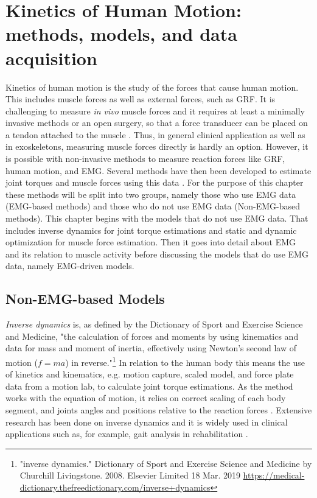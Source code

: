 \section{Kinetics of Human Motion: methods, models, and data acquisition}
\label{sec:A-MSModels}
Kinetics of human motion is the study of the forces that cause human motion. 
This includes muscle forces as well as external forces, such as \ac{GRF}.
It is challenging to measure \textit{in vivo} muscle forces and it requires at least a minimally invasive methods or an open surgery, so that a force transducer can be placed on a tendon attached to the muscle \cite{Erdemir2007}. 
Thus, in general clinical application as well as in exoskeletons, measuring muscle forces directly is hardly an option.
However, it is possible with non-invasive methods to measure reaction forces like \ac{GRF}, human motion, and \ac{EMG}.
Several methods have then been developed to estimate joint torques and muscle forces using this data \cite{Erdemir2007}.
For the purpose of this chapter these methods will be split into two groups, namely those who use \ac{EMG} data (\ac{EMG}-based methods) and those who do not use \ac{EMG} data (Non-\ac{EMG}-based methods).
This chapter begins with the models that do not use \ac{EMG} data.
That includes inverse dynamics for joint torque estimations and static and dynamic optimization for muscle force estimation. 
Then it goes into detail about \ac{EMG} and its relation to muscle activity before discussing the models that do use \ac{EMG} data, namely \ac{EMG}-driven models.

\subsection{Non-\ac{EMG}-based Models}
\label{sec:A-NonEMGBasedModels}
\textit{Inverse dynamics} is, as defined by the Dictionary of Sport and Exercise Science and Medicine, "the calculation of forces and moments by using kinematics and data for mass and moment of inertia, effectively using Newton's second law of motion ($f = ma$) in reverse."\footnote{"inverse dynamics." Dictionary of Sport and Exercise Science and Medicine by Churchill Livingstone. 2008. Elsevier Limited 18 Mar. 2019 \url{https://medical-dictionary.thefreedictionary.com/inverse+dynamics}}
In relation to the human body this means the use of kinetics and kinematics, e.g. motion capture, scaled model, and force plate data from a motion lab, to calculate joint torque estimations.
As the method works with the equation of motion, it relies on correct scaling of each body segment, and joints angles and positions relative to the reaction forces \cite{Buchanan2004,Erdemir2007}.
Extensive research has been done on inverse dynamics and it is widely used in clinical applications such as, for example, gait analysis in rehabilitation \cite{Erdemir2007,Buchanan2004,Pizzolato2015}.

